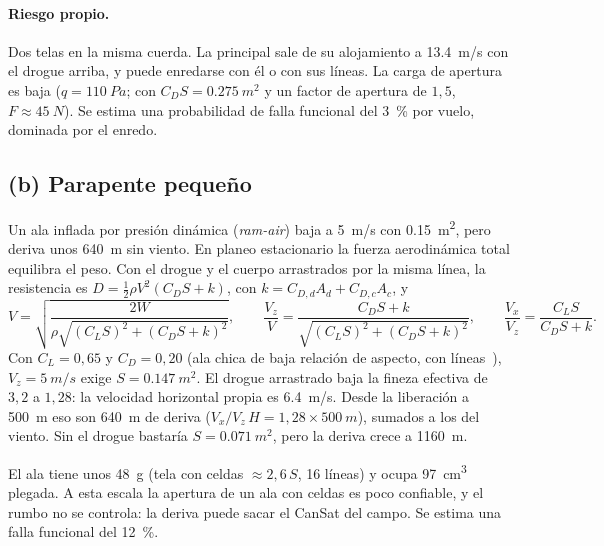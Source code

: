 \paragraph{Riesgo propio.} Dos telas en la misma cuerda. La principal sale de su
alojamiento a \SI{13.4}{m/s} con el drogue arriba, y puede enredarse con él o con sus
líneas. La carga de apertura es baja ($q=\SI{110}{Pa}$; con $C_DS=\SI{0.275}{m^2}$ y un
factor de apertura de $1{,}5$, $F\approx\SI{45}{N}$). Se estima una probabilidad de falla
funcional del \SI{3}{\percent} por vuelo, dominada por el enredo.

\subsection{(b) Parapente pequeño}\label{sec:decision-pp}
Un ala inflada por presión dinámica (\emph{ram-air}) baja a \SI{5}{m/s} con
\SI{0.15}{m^2}, pero deriva unos \SI{640}{m} sin viento. En planeo estacionario la fuerza
aerodinámica total equilibra el peso. Con el drogue y el cuerpo arrastrados por la misma
línea, la resistencia es $D=\tfrac12\rho V^2(C_DS+k)$, con $k=C_{D,d}A_d+C_{D,c}A_c$, y
\begin{equation}
  V=\sqrt{\frac{2W}{\rho\sqrt{(C_LS)^2+(C_DS+k)^2}}},\qquad
  \frac{V_z}{V}=\frac{C_DS+k}{\sqrt{(C_LS)^2+(C_DS+k)^2}},\qquad
  \frac{V_x}{V_z}=\frac{C_LS}{C_DS+k}.
  \label{eq:decision-pp}
\end{equation}
Con $C_L=0{,}65$ y $C_D=0{,}20$ (ala chica de baja relación de aspecto, con
líneas~\cite{decision-lingard1995}), $V_z=\SI{5}{m/s}$ exige $S=\SI{0.147}{m^2}$. El
drogue arrastrado baja la fineza efectiva de $3{,}2$ a $1{,}28$: la velocidad horizontal
propia es \SI{6.4}{m/s}. Desde la liberación a \SI{500}{m} eso son \SI{640}{m} de deriva
($V_x/V_z\,H=1{,}28\times\SI{500}{m}$), sumados a los del viento. Sin el drogue
bastaría $S=\SI{0.071}{m^2}$, pero la deriva crece a \SI{1160}{m}.

El ala tiene unos \SI{48}{g} (tela con celdas $\approx2{,}6\,S$, 16 líneas) y ocupa
\SI{97}{cm^3} plegada. A esta escala la apertura de un ala con celdas es poco
confiable, y el rumbo no se controla: la deriva puede sacar el CanSat del campo. Se estima
una falla funcional del \SI{12}{\percent}.

